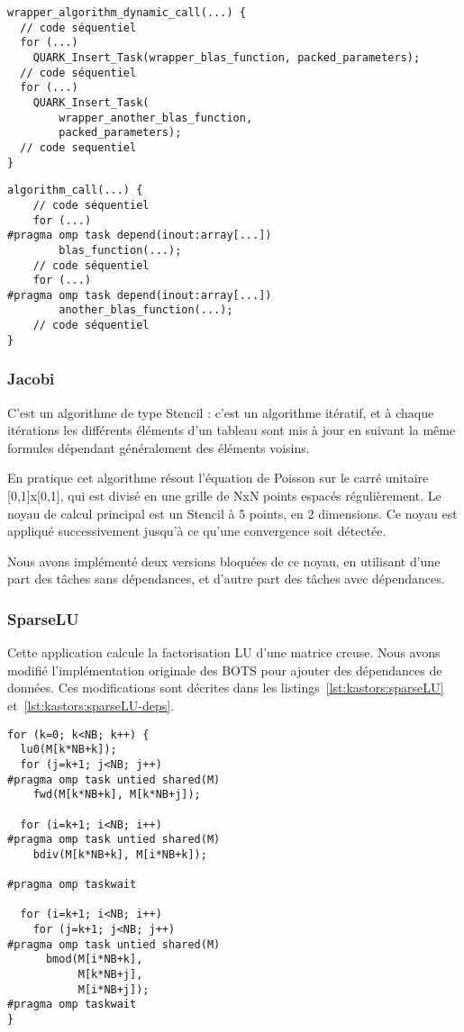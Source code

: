 \begin{lstlisting}[caption=Format de l'algorithme dynamique,label=lst:kastors:dyn]
wrapper_algorithm_dynamic_call(...) {
  // code séquentiel
  for (...)
    QUARK_Insert_Task(wrapper_blas_function, packed_parameters);
  // code séquentiel
  for (...)
    QUARK_Insert_Task(
        wrapper_another_blas_function,
        packed_parameters);
  // code sequentiel
}
\end{lstlisting}
\begin{lstlisting}[caption=Format de l'algorithme OpenMP,label=lst:kastors:dyn-omp]
algorithm_call(...) {
    // code séquentiel
    for (...)
#pragma omp task depend(inout:array[...])
        blas_function(...);
    // code séquentiel
    for (...)
#pragma omp task depend(inout:array[...])
        another_blas_function(...);
    // code séquentiel
}
\end{lstlisting}


\subsubsection{Jacobi}

C'est un algorithme de type Stencil : c'est un algorithme itératif, et à chaque itérations les différents éléments d'un tableau sont mis à jour en suivant la même formules dépendant généralement des éléments voisins.

En pratique cet algorithme résout l'équation de Poisson sur le carré unitaire [0,1]x[0,1], qui est divisé en une grille de NxN points espacés régulièrement.
Le noyau de calcul principal est un Stencil à 5 points, en 2 dimensions.
Ce noyau est appliqué successivement jusqu'à ce qu'une convergence soit détectée.

Nous avons implémenté deux versions bloquées de ce noyau, en utilisant d'une part des tâches sans dépendances, et d'autre part des tâches avec dépendances.

\subsubsection{SparseLU}\label{sec:kastors:sparselu}

Cette application calcule la factorisation LU d'une matrice creuse.
Nous avons modifié l'implémentation originale des BOTS pour ajouter des dépendances de données.
Ces modifications sont décrites dans les listings~\ref{lst:kastors:sparseLU} et~\ref{lst:kastors:sparseLU-deps}.

\begin{lstlisting}[caption=LU utilisant des tâches indépendantes,label=lst:kastors:sparseLU]
for (k=0; k<NB; k++) {
  lu0(M[k*NB+k]);
  for (j=k+1; j<NB; j++)
#pragma omp task untied shared(M)
    fwd(M[k*NB+k], M[k*NB+j]);

  for (i=k+1; i<NB; i++)
#pragma omp task untied shared(M)
    bdiv(M[k*NB+k], M[i*NB+k]);

#pragma omp taskwait

  for (i=k+1; i<NB; i++)
    for (j=k+1; j<NB; j++)
#pragma omp task untied shared(M)
      bmod(M[i*NB+k],
           M[k*NB+j],
           M[i*NB+j]);
#pragma omp taskwait
}
\end{lstlisting}

